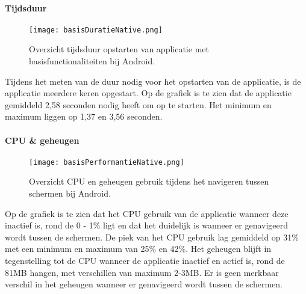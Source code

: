 \paragraph{Tijdsduur}
\begin{figure}[H]
    \centering
    \texttt{[image: basisDuratieNative.png]}
    \caption{Overzicht tijdsduur opstarten van applicatie met basisfunctionaliteiten bij Android.}
\end{figure}
Tijdens het meten van de duur nodig voor het opstarten van de applicatie, 
is de applicatie meerdere keren opgestart. Op de grafiek is te zien dat de applicatie
gemiddeld 2,58 seconden nodig heeft om op te starten. Het minimum en maximum 
liggen op 1,37 en 3,56 seconden.

\paragraph{CPU \& geheugen}
\begin{figure}[H]
    \centering
    \texttt{[image: basisPerformantieNative.png]}
    \caption{Overzicht CPU en geheugen gebruik tijdens het navigeren tussen schermen bij Android.}
\end{figure}
Op de grafiek is te zien dat het CPU gebruik van de applicatie wanneer deze 
inactief is, rond de 0 - 1\% ligt en dat het duidelijk is wanneer er
genavigeerd wordt tussen de schermen. De piek van het CPU gebruik lag gemiddeld
op 31\% met een minimum en maximum van 25\% en 42\%. Het geheugen blijft in tegenstelling
tot de CPU wanneer de applicatie inactief en actief is, rond de 81MB hangen, met
verschillen van maximum 2-3MB. Er is geen merkbaar verschil in het geheugen wanneer
er genavigeerd wordt tussen de schermen.


